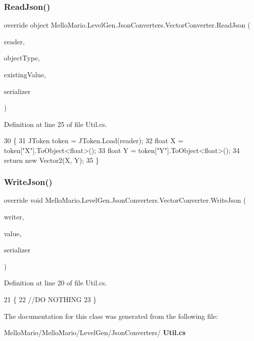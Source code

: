 \subsubsection{Read\+Json()}
{\footnotesize\ttfamily override object Mello\+Mario.\+Level\+Gen.\+Json\+Converters.\+Vector\+Converter.\+Read\+Json (\begin{DoxyParamCaption}\item[{Json\+Reader}]{reader,  }\item[{Type}]{object\+Type,  }\item[{object}]{existing\+Value,  }\item[{Json\+Serializer}]{serializer }\end{DoxyParamCaption})}



Definition at line 25 of file Util.\+cs.


\begin{DoxyCode}
30         \{
31             JToken token = JToken.Load(reader);
32             \textcolor{keywordtype}{float} X = token[\textcolor{stringliteral}{"X"}].ToObject<\textcolor{keywordtype}{float}>();
33             \textcolor{keywordtype}{float} Y = token[\textcolor{stringliteral}{"Y"}].ToObject<\textcolor{keywordtype}{float}>();
34             \textcolor{keywordflow}{return} \textcolor{keyword}{new} Vector2(X, Y);
35         \}
\end{DoxyCode}
\mbox{\label{classMelloMario_1_1LevelGen_1_1JsonConverters_1_1VectorConverter_a54676bbb9ed233d0ab304f39c3201cfb}} 
\subsubsection{Write\+Json()}
{\footnotesize\ttfamily override void Mello\+Mario.\+Level\+Gen.\+Json\+Converters.\+Vector\+Converter.\+Write\+Json (\begin{DoxyParamCaption}\item[{Json\+Writer}]{writer,  }\item[{object}]{value,  }\item[{Json\+Serializer}]{serializer }\end{DoxyParamCaption})}



Definition at line 20 of file Util.\+cs.


\begin{DoxyCode}
21         \{
22             \textcolor{comment}{//DO NOTHING}
23         \}
\end{DoxyCode}


The documentation for this class was generated from the following file\+:\begin{DoxyCompactItemize}
\item 
Mello\+Mario/\+Mello\+Mario/\+Level\+Gen/\+Json\+Converters/\textbf{ Util.\+cs}\end{DoxyCompactItemize}
